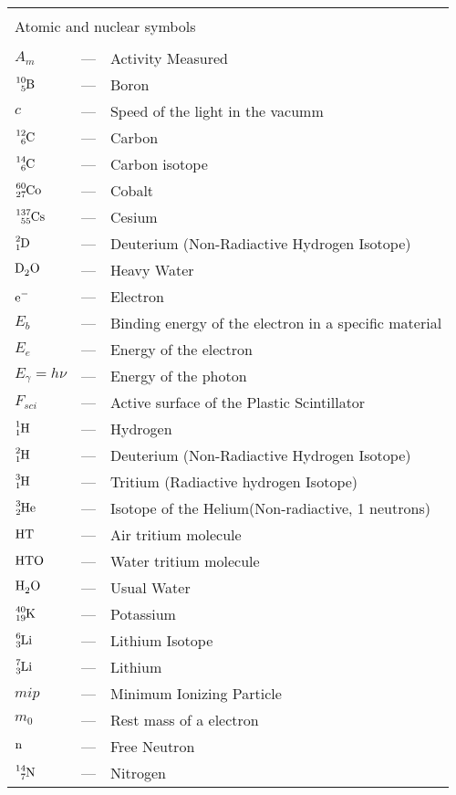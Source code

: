 \begin{longtable}{p{25mm} c p{120mm} }
\\
\\
\multicolumn{3}{l}{Atomic and nuclear symbols}\\
\\
$A_{m}$ & --- & Activity Measured\\
$\ce{^{10}_{5}B}$ & --- & Boron\\
$c$ & --- & Speed of the light in the vacumm\\
$\ce{^{12}_{6}C}$ & --- & Carbon\\
$\ce{^{14}_{6}C}$ & --- & Carbon isotope\\
$\ce{^{60}_{27}Co}$ & --- & Cobalt\\
$\ce{^{137}_{55}Cs}$ & --- & Cesium\\
$\ce{^{2}_{1}D}$ & --- & Deuterium (Non-Radiactive Hydrogen Isotope)\\
$\ce{D_{2}O}$ & --- & Heavy Water\\
$\ce{e^-}$ & --- & Electron\\
$E_b$ & --- & Binding energy of the electron in a specific material\\
$E_e$ & --- & Energy of the electron\\
$E_\gamma = h\nu$ & --- & Energy of the photon\\
$F_{sci}$ & --- & Active surface of the Plastic Scintillator\\
$\ce{^{1}_{1}H}$ & --- & Hydrogen\\
$\ce{^{2}_{1}H}$ & --- & Deuterium (Non-Radiactive Hydrogen Isotope)\\
$\ce{^{3}_{1}H}$ & --- & Tritium (Radiactive hydrogen Isotope)\\
$\ce{^{3}_{2}He}$ & --- & Isotope of the Helium(Non-radiactive, 1 neutrons)\\
$\ce{HT}$ & --- & Air tritium molecule\\
$\ce{HTO}$ & --- & Water tritium molecule\\
$\ce{H_{2}O}$ & --- & Usual Water\\
$\ce{^{40}_{19}K}$ & --- & Potassium\\
$\ce{^{6}_{3}Li}$ & --- & Lithium Isotope\\
$\ce{^{7}_{3}Li}$ & --- & Lithium\\
$mip$ & --- & Minimum Ionizing Particle\\
$m_0$ & --- & Rest mass of a electron\\
$\ce{n}$ & --- & Free Neutron\\
$\ce{^{14}_{7}N}$ & --- & Nitrogen\\

\end{longtable}
